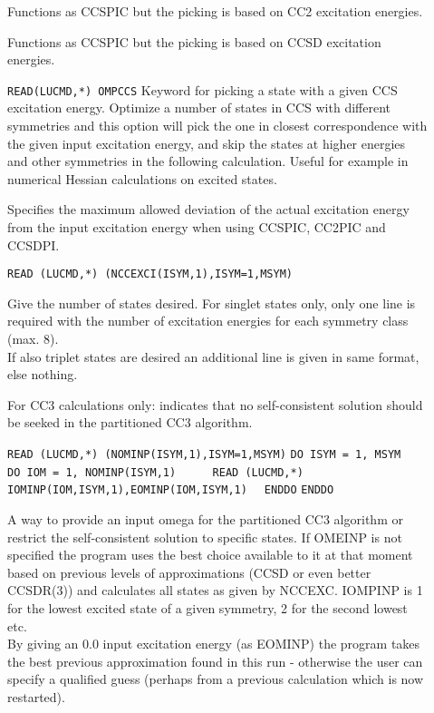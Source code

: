 \begin{description}
\item[] 
Functions as CCSPIC but the picking is based on CC2 excitation energies.
\item[] 
Functions as CCSPIC but the picking is based on CCSD excitation energies.
%
\item[] 

\verb|READ(LUCMD,*) OMPCCS| \newline
Keyword for picking a state with a given CCS excitation energy.
Optimize a number of states in CCS with different symmetries and this option
will pick the one in closest correspondence with the given input excitation
energy, and skip the states at higher energies and other symmetries in 
the following calculation.
Useful for example in numerical Hessian calculations on excited states.

\item[] 
Specifies the maximum allowed deviation of the actual excitation energy
from the input excitation energy when using CCSPIC, CC2PIC and CCSDPI. 

\item[] 

\verb|READ (LUCMD,*) (NCCEXCI(ISYM,1),ISYM=1,MSYM)|

Give the number of states desired.
For singlet states only, only one line is required with
the number of excitation energies for each symmetry class (max. 8). \\ 
If also triplet states are desired an additional line is given in same format, 
else nothing.
%
\item[] 
%
For CC3 calculations only: indicates that no self-consistent solution
should be seeked in the partitioned CC3 algorithm.

\item[] 
%
\noindent\verb|READ (LUCMD,*) (NOMINP(ISYM,1),ISYM=1,MSYM)|\newline
\verb|DO ISYM = 1, MSYM|\newline
\verb|  DO IOM = 1, NOMINP(ISYM,1)|\newline
\verb|     READ (LUCMD,*) IOMINP(IOM,ISYM,1),EOMINP(IOM,ISYM,1)|\newline
\verb|  ENDDO|\newline
\verb|ENDDO|

A way to provide an input omega for the partitioned CC3 algorithm or restrict
the self-consistent solution to specific states.
If OMEINP is not specified the program uses the best choice available to it at that
moment based on previous levels of approximations (CCSD or even better CCSDR(3)) 
and calculates all states as given by NCCEXC.
IOMPINP is 1 for the lowest excited state of a given symmetry, 2 for the second lowest etc. \\
By giving an 0.0 input excitation energy (as EOMINP) the program takes the best previous
approximation found in this run - otherwise the user can specify a qualified guess 
(perhaps from a previous calculation which is now restarted).


\end{description}
